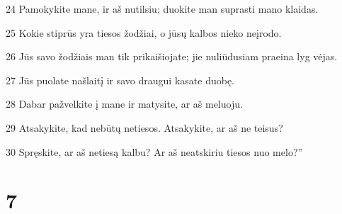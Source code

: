 \par 24 Pamokykite mane, ir aš nutilsiu; duokite man suprasti mano klaidas. 
\par 25 Kokie stiprūs yra tiesos žodžiai, o jūsų kalbos nieko neįrodo. 
\par 26 Jūs savo žodžiais man tik prikaišiojate; jie nuliūdusiam praeina lyg vėjas. 
\par 27 Jūs puolate našlaitį ir savo draugui kasate duobę. 
\par 28 Dabar pažvelkite į mane ir matysite, ar aš meluoju. 
\par 29 Atsakykite, kad nebūtų netiesos. Atsakykite, ar aš ne teisus? 
\par 30 Spręskite, ar aš netiesą kalbu? Ar aš neatskiriu tiesos nuo melo?”



\chapter{7}



